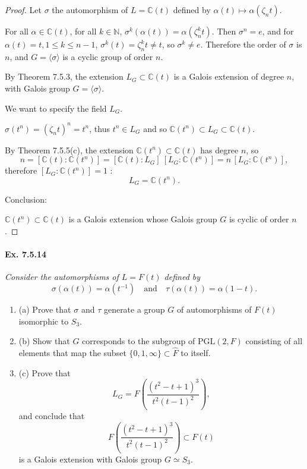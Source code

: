 \documentclass[11pt,a4paper]{article}
\newcommand{\be} {\begin{enumerate}}
\newcommand{\ee} {\end{enumerate}}
\newcommand{\N}{\mathbb{N}}
\newcommand{\C}{\mathbb{C}}
\begin{document}
\begin{proof}
Let $\sigma$ the automorphism of $L = \C(t)$ defined by $\alpha(t) \mapsto \alpha(\zeta_n t)$.

For all $\alpha \in \C(t)$, for all $k \in \N$, $\sigma^k(\alpha(t)) =\alpha( \zeta_n^k t)$. Then $\sigma^n = e$, and for $\alpha(t) = t, 1\leq k \leq n-1$, $\sigma^k(t) = \zeta_n^k t \ne t$, so $\sigma^k \ne e$. Therefore the order of $\sigma$ is $n$, and $G = \langle \sigma \rangle$ is a cyclic group of order $n$.

By Theorem 7.5.3, the extension $L_G \subset \C(t)$ is a Galois extension of degree $n$, with Galois group $G = \langle \sigma \rangle$.

We want to specify the field $L_G$.

$\sigma(t^n) = (\zeta_nt)^n=t^n$, thus $t^n\in L_G$ and so $\C(t^n) \subset L_G \subset \C(t)$.

By Theorem 7.5.5(c), the extension $\C(t^n) \subset \C(t)$ has degree $n$, so
$$n = [\C(t):\C(t^n)] = [\C(t):L_G]\ [L_G:\C(t^n)] = n\, [L_G:\C(t^n)],$$
therefore $[L_G:\C(t^n)]=1$ : 
$$L_G = \C(t^n).$$

Conclusion:

$\C(t^n)\subset \C(t)$ is a Galois extension whose Galois group $G$ is cyclic of order $n$.
\end{proof}

\paragraph{Ex. 7.5.14}

{\it Consider the automorphisms of $L = F(t)$ defined by
$$\sigma\left(\alpha(t)\right) =\alpha(t^{-1})\quad \mathrm{and}\quad \tau\left(\alpha(t)\right) = \alpha(1-t).$$
\be
\item[(a)] Prove that $\sigma$ and $\tau$ generate a group $G$ of automorphisms of $F(t)$ isomorphic to $S_3$.
\item[(b)] Show that $G$ corresponds to the subgroup of $\mathrm{PGL}(2,F)$ consisting of all elements that map the subset $\{0,1,\infty\} \subset \hat{F}$ to itself.
\item[(c)] Prove that
$$L_G = F\left( \frac{(t^2-t+1)^3}{t^2(t-1)^2}\right),$$
and conclude that
$$F\left( \frac{(t^2-t+1)^3}{t^2(t-1)^2}\right) \subset F(t)$$
is a Galois extension with Galois group $G \simeq S_3$.
\ee
}
\end{document}

